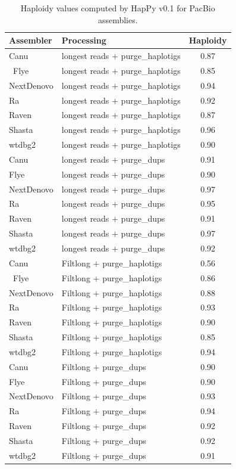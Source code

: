 \begin{suppsection}
\begin{table}[ht]
\centering
\caption{Haploidy values computed by HapPy v0.1 for PacBio assemblies.}
\begin{tabular}{llc}
\hline
\textbf{Assembler} & \textbf{Processing} & \textbf{Haploidy} \\
\hline
Canu & longest reads $+$ purge\_haplotigs & 0.87 \\ \
Flye & longest reads $+$ purge\_haplotigs & 0.85 \\
NextDenovo & longest reads $+$ purge\_haplotigs & 0.94 \\
Ra & longest reads $+$ purge\_haplotigs & 0.92 \\
Raven & longest reads $+$ purge\_haplotigs & 0.87 \\
Shasta & longest reads $+$ purge\_haplotigs & 0.96 \\
wtdbg2 & longest reads $+$ purge\_haplotigs & 0.90 \\
Canu & longest reads $+$ purge\_dups & 0.91 \\
Flye & longest reads $+$ purge\_dups & 0.90 \\
NextDenovo & longest reads $+$ purge\_dups & 0.97 \\
Ra & longest reads $+$ purge\_dups & 0.95 \\
Raven & longest reads $+$ purge\_dups & 0.91 \\
Shasta & longest reads $+$ purge\_dups & 0.97 \\
wtdbg2 & longest reads $+$ purge\_dups & 0.92 \\
Canu & Filtlong $+$ purge\_haplotigs & 0.56 \\ \
Flye & Filtlong $+$ purge\_haplotigs & 0.86 \\
NextDenovo & Filtlong $+$ purge\_haplotigs & 0.88 \\
Ra & Filtlong $+$ purge\_haplotigs & 0.93 \\
Raven & Filtlong $+$ purge\_haplotigs & 0.90 \\
Shasta & Filtlong $+$ purge\_haplotigs & 0.85 \\
wtdbg2 & Filtlong $+$ purge\_haplotigs & 0.94 \\
Canu & Filtlong $+$ purge\_dups & 0.90 \\
Flye & Filtlong $+$ purge\_dups & 0.90 \\
NextDenovo & Filtlong $+$ purge\_dups & 0.93 \\
Ra & Filtlong $+$ purge\_dups & 0.94 \\
Raven & Filtlong $+$ purge\_dups & 0.92 \\
Shasta & Filtlong $+$ purge\_dups & 0.92 \\
wtdbg2 & Filtlong $+$ purge\_dups & 0.91 \\
\hline
\end{tabular}
\label{tab:pacbio_happy_part2}
\end{table}


\end{suppsection}
